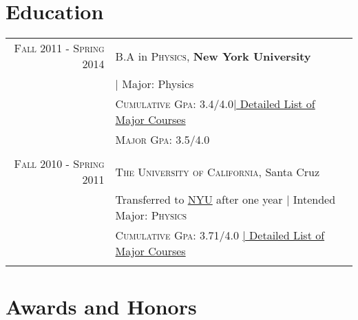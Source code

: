 \documentclass[a4paper,10pt]{article} %
\begin{document}
\section{Education}
\hypertarget{nyu}{}	
\begin{tabular}{rl}
\textsc{Fall} 2011 - \textsc{Spring} 2014 & B.A in \textsc{Physics},
\textbf{New York University}\\
&| Major: Physics\\
&\normalsize \textsc{Cumulative Gpa}: 3.4/4.0\hyperlink{grds}{\hfill |
  \footnotesize Detailed List of Major Courses}\\
&\normalsize \textsc{Major Gpa}: 3.5/4.0\\
&\\


\textsc{Fall} 2010 - \textsc{Spring} 2011& \textsc{The University of
  California}, Santa Cruz \\
& Transferred to \hyperlink{nyu}{NYU} after one year | \small Intended
Major: \textsc{Physics} \\
&\normalsize \textsc{Cumulative Gpa}: 3.71/4.0 \hyperlink{grds_ucsc}{\hfill|
  \footnotesize Detailed List of Major Courses}\\
&\\




\end{tabular}


\section{Awards and Honors}
\end{document}
